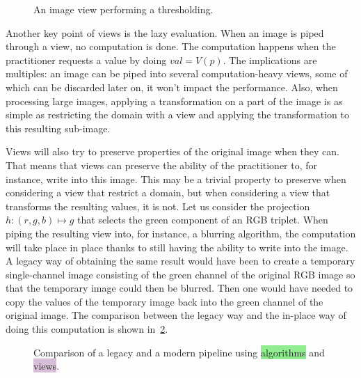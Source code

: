\begin{figure}[tbh]
  \centering
  \begin{minipage}{\linewidth}
    
  \end{minipage}
  \caption{An image view performing a thresholding.}
  \label{fig.view.threshold}
\end{figure}

Another key point of views is the lazy evaluation. When an image is piped through a view, no computation is done. The
computation happens when the practitioner requests a value by doing $val = V(p)$. The implications are multiples: an
image can be piped into several computation-heavy views, some of which can be discarded later on, it won't impact the
performance. Also, when processing large images, applying a transformation on a part of the image is as simple as
restricting the domain with a view and applying the transformation to this resulting sub-image.

Views will also try to preserve properties of the original image when they can. That means that views can preserve the
ability of the practitioner to, for instance, write into this image. This may be a trivial property to preserve when
considering a view that restrict a domain, but when considering a view that transforms the resulting values, it is not.
Let us consider the projection $h: (r,g,b) \mapsto g$ that selects the green component of an RGB triplet. When piping
the resulting view into, for instance, a blurring algorithm, the computation will take place in place thanks to still
having the ability to write into the image. A legacy way of obtaining the same result would have been to create a
temporary single-channel image consisting of the green channel of the original RGB image so that the temporary image
could then be blurred. Then one would have needed to copy the values of the temporary image back into the green channel
of the original image. The comparison between the legacy way and the in-place way of doing this computation is shown
in~\cref{fig.legacy.vs.view}.

\begin{figure}[tbh]
  \centering
  \hfil

  \caption{Comparison of a legacy and a modern pipeline using \colorbox{lightgreen}{algorithms} and
    \colorbox{thistle}{views}.}
  \label{fig.legacy.vs.view}
\end{figure}

